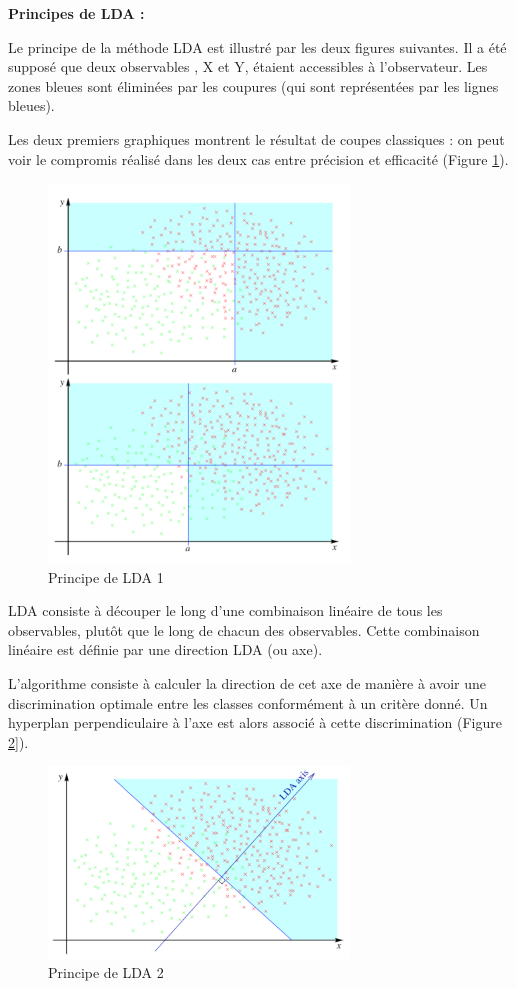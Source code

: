 \smallbreak
\textbf{Principes de LDA : }
\smallbreak

Le principe de la méthode LDA est illustré par les deux figures suivantes. Il a été supposé que deux observables , X et Y, étaient accessibles à l'observateur. Les zones bleues sont éliminées par les coupures (qui sont représentées par les lignes bleues).

Les deux premiers graphiques montrent le résultat de coupes classiques : on peut voir le compromis réalisé dans les deux cas entre précision et efficacité (Figure \ref{principeLDA1}).


\begin{figure}[h]
	\centering\includegraphics[width=8cm]{images/principeLDA1.png}
	\caption[Principe de LDA 1]{Principe de LDA 1 \cite{Faivre}}
	\label{principeLDA1}
\end{figure}

LDA consiste à découper le long d'une combinaison linéaire de tous les observables, plutôt que le long de chacun des observables. Cette combinaison linéaire est définie par une direction LDA (ou axe). 

L'algorithme consiste à calculer la direction de cet axe de manière à avoir une discrimination optimale entre les classes conformément à un critère donné. Un hyperplan perpendiculaire à l'axe est alors associé à cette discrimination (Figure \ref{principeLDA2}]).

\begin{figure}[h]
	\centering\includegraphics[width=8cm]{images/principeLDA2.png}
	\caption[Principe de LDA 2]{Principe de LDA 2 \cite{Faivre}}
	\label{principeLDA2}
\end{figure}

